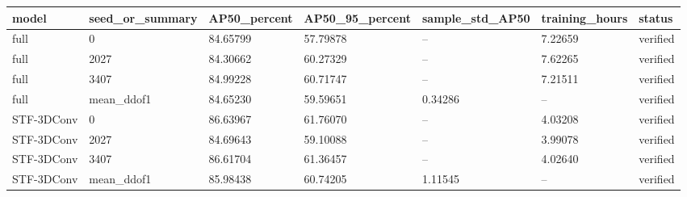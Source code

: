 \begin{tabular}{lllllll}
\hline
model & seed\_or\_summary & AP50\_percent & AP50\_95\_percent & sample\_std\_AP50 & training\_hours & status \\
\hline
full & 0 & 84.65799 & 57.79878 & -- & 7.22659 & verified \\
full & 2027 & 84.30662 & 60.27329 & -- & 7.62265 & verified \\
full & 3407 & 84.99228 & 60.71747 & -- & 7.21511 & verified \\
full & mean\_ddof1 & 84.65230 & 59.59651 & 0.34286 & -- & verified \\
STF-3DConv & 0 & 86.63967 & 61.76070 & -- & 4.03208 & verified \\
STF-3DConv & 2027 & 84.69643 & 59.10088 & -- & 3.99078 & verified \\
STF-3DConv & 3407 & 86.61704 & 61.36457 & -- & 4.02640 & verified \\
STF-3DConv & mean\_ddof1 & 85.98438 & 60.74205 & 1.11545 & -- & verified \\
\hline
\end{tabular}
